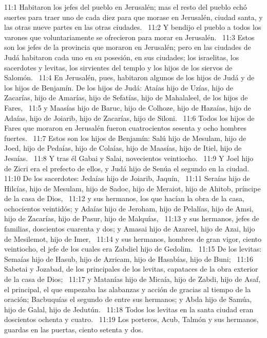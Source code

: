 11:1 Habitaron los jefes del pueblo en Jerusalén; mas el resto del pueblo echó suertes para traer uno de cada diez para que morase en Jerusalén, ciudad santa, y las otras nueve partes en las otras ciudades.  
11:2 Y bendijo el pueblo a todos los varones que voluntariamente se ofrecieron para morar en Jerusalén.  
11:3 Estos son los jefes de la provincia que moraron en Jerusalén; pero en las ciudades de Judá habitaron cada uno en su posesión, en sus ciudades; los israelitas, los sacerdotes y levitas, los sirvientes del templo y los hijos de los siervos de Salomón.  
11:4 En Jerusalén, pues, habitaron algunos de los hijos de Judá y de los hijos de Benjamín. De los hijos de Judá: Ataías hijo de Uzías, hijo de Zacarías, hijo de Amarías, hijo de Sefatías, hijo de Mahalaleel, de los hijos de Fares,  
11:5 y Maasías hijo de Baruc, hijo de Colhoze, hijo de Hazaías, hijo de Adaías, hijo de Joiarib, hijo de Zacarías, hijo de Siloni.  
11:6 Todos los hijos de Fares que moraron en Jerusalén fueron cuatrocientos sesenta y ocho hombres fuertes.  
11:7 Estos son los hijos de Benjamín: Salú hijo de Mesulam, hijo de Joed, hijo de Pedaías, hijo de Colaías, hijo de Maasías, hijo de Itiel, hijo de Jesaías.  
11:8 Y tras él Gabai y Salai, novecientos veintiocho.  
11:9 Y Joel hijo de Zicri era el prefecto de ellos, y Judá hijo de Senúa el segundo en la ciudad.  
11:10 De los sacerdotes: Jedaías hijo de Joiarib, Jaquín,  
11:11 Seraías hijo de Hilcías, hijo de Mesulam, hijo de Sadoc, hijo de Meraiot, hijo de Ahitob, príncipe de la casa de Dios,  
11:12 y sus hermanos, los que hacían la obra de la casa, ochocientos veintidós; y Adaías hijo de Jeroham, hijo de Pelalías, hijo de Amsi, hijo de Zacarías, hijo de Pasur, hijo de Malquías,  
11:13 y sus hermanos, jefes de familias, doscientos cuarenta y dos; y Amasai hijo de Azareel, hijo de Azai, hijo de Mesilemot, hijo de Imer,  
11:14 y sus hermanos, hombres de gran vigor, ciento veintiocho, el jefe de los cuales era Zabdiel hijo de Gedolim.  
11:15 De los levitas: Semaías hijo de Hasub, hijo de Azricam, hijo de Hasabías, hijo de Buni;  
11:16 Sabetai y Jozabad, de los principales de los levitas, capataces de la obra exterior de la casa de Dios;  
11:17 y Matanías hijo de Micaía, hijo de Zabdi, hijo de Asaf, el principal, el que empezaba las alabanzas y acción de gracias al tiempo de la oración; Bacbuquías el segundo de entre sus hermanos; y Abda hijo de Samúa, hijo de Galal, hijo de Jedutún.  
11:18 Todos los levitas en la santa ciudad eran doscientos ochenta y cuatro.  
11:19 Los porteros, Acub, Talmón y sus hermanos, guardas en las puertas, ciento setenta y dos. 
